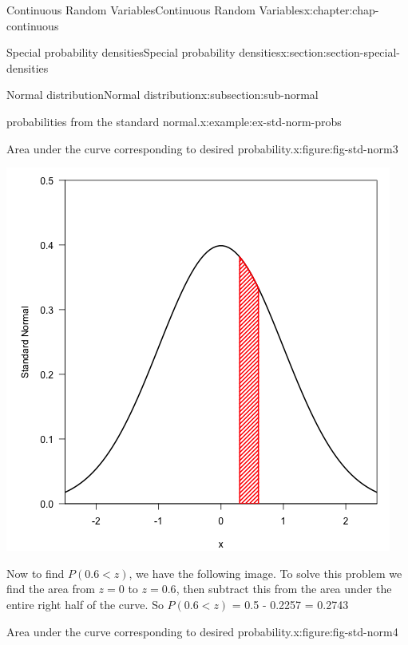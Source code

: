 \documentclass[oneside,10pt,]{book}
\newcommand{\lt}{<}
\begin{document}
\begin{chapterptx}{Continuous Random Variables}{}{Continuous Random Variables}{}{}{x:chapter:chap-continuous}
\begin{sectionptx}{Special probability densities}{}{Special probability densities}{}{}{x:section:section-special-densities}
\begin{subsectionptx}{Normal distribution}{}{Normal distribution}{}{}{x:subsection:sub-normal}
\begin{example}{probabilities from the standard normal.}{x:example:ex-std-norm-probs}
\begin{figureptx}{Area under the curve corresponding to desired probability.}{x:figure:fig-std-norm3}{}
\begin{image}{0.25}{0.5}{0.25}
\includegraphics[width=\linewidth]{./images/std_norm3.png}
\end{image}%
\tcblower
\end{figureptx}%
Now to find \(P(0.6 \lt z)\), we have the following image.  To solve this problem we find the area from \(z=0\) to \(z=0.6\), then subtract this from the area under the entire right half of the curve.  So \(P(0.6 \lt z)\) = 0.5 - 0.2257 = 0.2743%
\begin{figureptx}{Area under the curve corresponding to desired probability.}{x:figure:fig-std-norm4}{}%
\begin{image}{0.25}{0.5}{0.25}%

\end{image}
\end{figureptx}
\end{example}
\end{subsectionptx}
\end{sectionptx}
\end{chapterptx}
\end{document}

